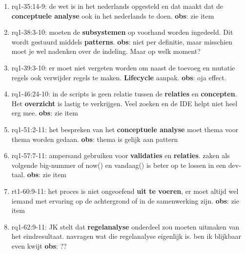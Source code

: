 \begin{enumerate}
    \item rq1-35:14-9: de wet is in het nederlands opgesteld en dat maakt dat de \textbf{conceptuele analyse} ook in het nederlands te doen.
    \newline\textbf{obs}: zie item
    
    \item rq1-38:3-10: moeten de \textbf{subsystemen} op voorhand worden ingedeeld. Dit wordt gestuurd middels \textbf{patterns}. 
    \newline\textbf{obs}: niet per definitie, maar misschien moet je wel nadenken over de indeling. 
    Maar op welk moment?
    
    \item rq1-39:3-10: er moet niet vergeten worden om naast de toevoeg en mutatie regels ook verwijder regels te maken. \textbf{Lifecycle} aanpak.
    \newline\textbf{obs}: oja effect.
    
    \item rq1-46:24-10: in de scripts is geen relatie tussen de \textbf{relaties} en \textbf{concepten}. Het \textbf{overzicht} is lastig te verkrijgen. Veel zoeken en de IDE helpt niet heel erg mee.
    \newline\textbf{obs}: zie item
    
    \item rq1-51:2-11: het bespreken van het \textbf{conceptuele analyse} moet thema voor thema worden gedaan.
    \newline\textbf{obs}: thema is gelijk aan pattern
    
    \item rq1-57:7-11: ampersand gebruiken voor \textbf{validaties} en \textbf{relaties}. 
    zaken als volgende big-nummer of now() en vandaag() is beter op te lossen in een dev-taal.
    \newline\textbf{obs}: zie item
    
    \item rt1-60:9-11: het proces is niet ongeoefend \textbf{uit te voeren}, er moet altijd wel iemand met ervaring op de achtergrond of in de samenwerking zijn.
    \newline\textbf{obs}: zie item
    
    \item rq1-62:9-11: JK stelt dat \textbf{regelanalyse} onderdeel zou moeten uitmaken van het eindresultaat. 
    navragen wat die regelanalyse eigenlijk is. ben ik blijkbaar even kwijt
    \newline\textbf{obs}: ??
    

\end{enumerate}
